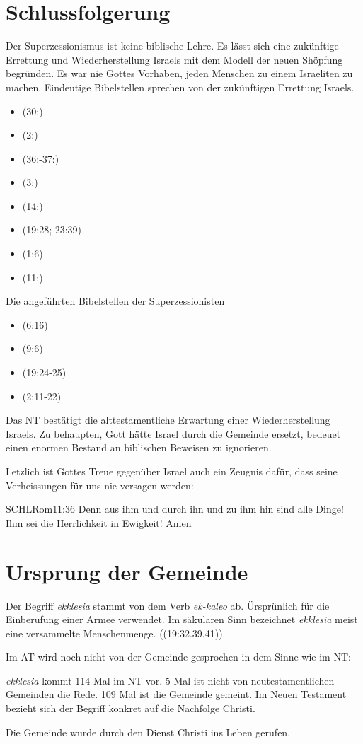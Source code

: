 \documentclass{../../inc/mybib}
\begin{document}
\section{Schlussfolgerung}
Der Superzessionismus ist keine biblische Lehre. Es lässt sich eine zukünftige Errettung und Wiederherstellung Israels mit dem Modell der neuen Shöpfung begründen. Es war nie Gottes Vorhaben, jeden Menschen zu einem Israeliten zu machen. Eindeutige Bibelstellen sprechen von der zukünftigen Errettung Israels.
\begin{itemize}
    \item {}(30:)
    \item {}(2:)
    \item {}(36:-37:)
    \item {}(3:)
    \item {}(14:)
    \item {}(19:28; 23:39)
    \item {}(1:6)
    \item {}(11:)
\end{itemize}
Die angeführten Bibelstellen der Superzessionisten
\begin{itemize}
    \item {}(6:16)
    \item {}(9:6)
    \item {}(19:24-25)
    \item {}(2:11-22)
\end{itemize}
Das NT bestätigt die alttestamentliche Erwartung einer Wiederherstellung Israels. Zu behaupten, Gott hätte Israel durch die Gemeinde ersetzt, bedeuet einen enormen Bestand an biblischen Beweisen zu ignorieren.

Letzlich ist Gottes Treue gegenüber Israel auch ein Zeugnis dafür, dass seine Verheissungen für uns nie versagen werden:
\begin{bibelbox}{SCHL}{Rom}{11:36}
    Denn aus ihm und durch ihn und zu ihm hin sind alle Dinge! Ihm sei die Herrlichkeit in Ewigkeit! Amen
\end{bibelbox}
\section{Ursprung der Gemeinde}
Der Begriff \textit{ekklesia} stammt von dem Verb \textit{ek-kaleo} ab. Ürsprünlich für die Einberufung einer Armee verwendet. Im säkularen Sinn bezeichnet \textit{ekklesia} meist eine versammelte Menschenmenge. ((19:32.39.41))

Im AT wird noch nicht von der Gemeinde gesprochen in dem Sinne wie im NT:

\textit{ekklesia} kommt 114 Mal im NT vor. 5 Mal ist nicht von neutestamentlichen Gemeinden die Rede. 109 Mal ist die Gemeinde gemeint. Im Neuen Testament bezieht sich der Begriff konkret auf die Nachfolge Christi.

Die Gemeinde wurde durch den Dienst Christi ins Leben gerufen.
\end{document}
